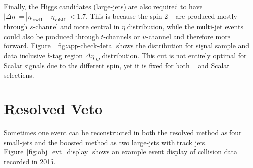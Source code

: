 \paragraph{}
Finally, the Higgs candidates (large-\R jets) are also required to have $|\Delta\eta| = |\eta_{\text{leadJ}} -\eta_{\text{sublJ}} |< 1.7$. 
This is because the spin 2 \Grav~ are produced mostly through $s$-channel and more central in $\eta$ distribution, while the multi-jet events could also be produced through $t$-channels or $u$-channel and therefore more forward. 
Figure ~\ref{fig:app-check-deta} shows the distribution for signal sample and data inclusive $b$-tag region $\Delta \eta_{JJ}$ distribution.
This cut is not entirely optimal for Scalar signals due to the different spin, yet it is fixed for both \Grav~ and Scalar selections.



\section{Resolved Veto}
\label{sec:resollvedveto}

\paragraph{}
Sometimes one event can be reconstructed in both the resolved method as four small-\R jets and the boosted method as two large-\R jets with track jets. Figure~\ref{fig:obj_evt_display} shows an example event display of collision data recorded in 2015.

